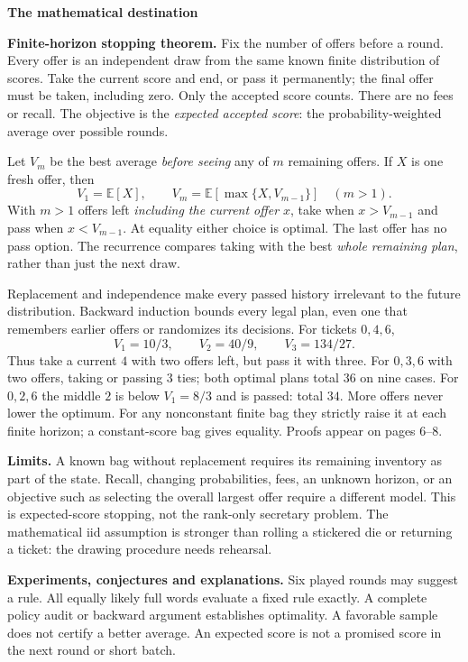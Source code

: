 \documentclass[11pt,letterpaper]{article}
\newcommand{\topic}[1]{\par\textbf{\large #1}\par}
\begin{document}
\topic{The mathematical destination}
\textbf{Finite-horizon stopping theorem.} Fix the number of offers before a round.
Every offer is an independent draw from the same known finite distribution of scores.
Take the current score and end, or pass it permanently; the final offer must be
taken, including zero. Only the accepted score counts. There are no fees or recall.
The objective is the \emph{expected accepted score}: the probability-weighted
average over possible rounds.

Let $V_m$ be the best average \emph{before seeing} any of $m$ remaining offers.
If $X$ is one fresh offer, then
\[
 V_1=\mathbb E[X],\qquad V_m=\mathbb E[\max\{X,V_{m-1}\}]\quad(m>1).
\]
With $m>1$ offers left \emph{including the current offer} $x$, take when
$x>V_{m-1}$ and pass when $x<V_{m-1}$. At equality either choice is optimal.
The last offer has no pass option. The recurrence compares taking with the best
\emph{whole remaining plan}, rather than just the next draw.

Replacement and independence make every passed history irrelevant to the
future distribution. Backward induction bounds every legal plan, even one that
remembers earlier offers or randomizes its decisions. For tickets $0,4,6$,
\[
 V_1=10/3,\qquad V_2=40/9,\qquad V_3=134/27.
\]
Thus take a current $4$ with two offers left, but pass it with three.
For $0,3,6$ with two offers, taking or passing $3$ ties; both optimal plans total
$36$ on nine cases. For $0,2,6$ the middle $2$ is below $V_1=8/3$ and is
passed: total $34$. More offers never lower the optimum. For any nonconstant
finite bag they strictly raise it at each finite horizon; a constant-score bag
gives equality. Proofs appear on pages 6--8.

\textbf{Limits.} A known bag without replacement requires its remaining inventory
as part of the state. Recall, changing probabilities, fees, an unknown horizon,
or an objective such as selecting the overall largest offer require a different
model. This is expected-score stopping, not the rank-only secretary problem.
The mathematical iid assumption is stronger than rolling a stickered die or
returning a ticket: the drawing procedure needs rehearsal.

\textbf{Experiments, conjectures and explanations.} Six played rounds may suggest
a rule. All equally likely full words evaluate a fixed rule exactly. A complete
policy audit or backward argument establishes optimality. A favorable sample
does not certify a better average. An expected score is not a promised score in
the next round or short batch.
\end{document}
